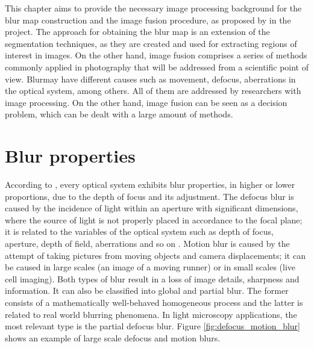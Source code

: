 

This chapter aims to provide the necessary image processing background for the blur map construction and the image fusion procedure, as proposed by in the project. The approach for obtaining the blur map is an extension of the segmentation techniques, as they are created and used for extracting regions of interest in images. On the other hand, image fusion comprises a series of methods commonly applied in photography that will be addressed from a scientific point of view. Blurmay have different causes such as movement, defocus, aberrations in the optical system, among others. All of them are addressed by researchers with image processing. On the other hand, image fusion can be seen as a decision problem, which can be dealt with a large amount of methods.

\section{Blur properties}

According to , every optical system exhibits blur properties, in higher or lower proportions, due to the depth of focus and its adjustment. The defocus blur is caused by the incidence of light within an aperture with significant dimensions, where the source of light is not properly placed in accordance to the focal plane; it is related to the variables of the optical system such as depth of focus, aperture, depth of field, aberrations and so on \cite{joshi2014defocus}. Motion blur is caused by the attempt of taking pictures from moving objects and camera displacements; it can be caused in large scales (an image of a moving runner) or in small scales (live cell imaging). Both types of blur result in a loss of image details, sharpness and information. It can also be classified into global and partial blur. The former consists of a mathematically well-behaved homogeneous process and the latter is related to real world blurring phenomena. In light microscopy applications, the most relevant type is the partial defocus blur. Figure \ref{fig:defocus_motion_blur} shows an example of large scale defocus and motion blurs.

